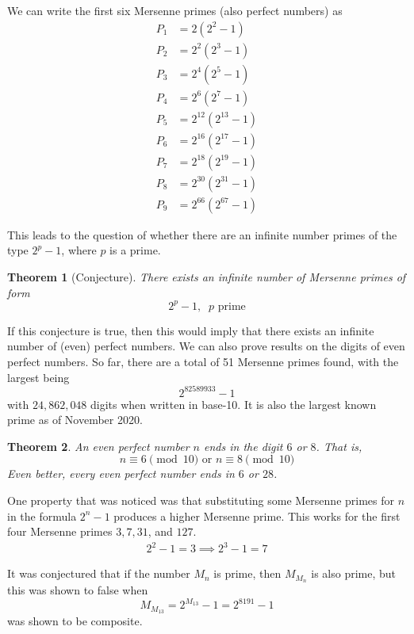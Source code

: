 \documentclass{article}
\newtheorem{theorem}{Theorem}[section]
\theoremstyle{remark}
\theoremstyle{definition}
\begin{document}
We can write the first six Mersenne primes (also perfect numbers) as 
\begin{align*}
    P_1 & = 2(2^2 -1) \\
    P_2 & = 2^2 (2^3 - 1) \\
    P_3 & = 2^4 (2^5 - 1) \\
    P_4 & = 2^6 (2^7 - 1) \\
    P_5 & = 2^{12} (2^{13} - 1) \\
    P_6 & = 2^{16} (2^{17} - 1) \\
    P_7 & = 2^{18} (2^{19} - 1) \\
    P_8 & = 2^{30} (2^{31} - 1) \\
    P_9 & = 2^{66} (2^{67} - 1) 
\end{align*}

This leads to the question of whether there are an infinite number primes of the type $2^p - 1$, where $p$ is a prime. 

\begin{theorem}[Conjecture]
There exists an infinite number of Mersenne primes of form
\[2^p - 1, \;\; p \text{ prime}\]
\end{theorem}

If this conjecture is true, then this would imply that there exists an infinite number of (even) perfect numbers. We can also prove results on the digits of even perfect numbers. So far, there are a total of 51 Mersenne primes found, with the largest being
\[2^{82589933} -1\]
with $24,862,048$ digits when written in base-10. It is also the largest known prime as of November 2020. 

\begin{theorem}
An even perfect number $n$ ends in the digit $6$ or $8$. That is, 
\[n \equiv 6 \pmod{10} \text{ or } n \equiv 8 \pmod{10}\]
Even better, every even perfect number ends in $6$ or $28$. 
\end{theorem}

One property that was noticed was that substituting some Mersenne primes for $n$ in the formula $2^n - 1$ produces a higher Mersenne prime. This works for the first four Mersenne primes $3, 7, 31$, and $127$. 
\begin{align*}
    2^2 - 1 = 3 \implies 2^3 - 1 = 7 
\end{align*}

It was conjectured that if the number $M_n$ is prime, then $M_{M_n}$ is also prime, but this was shown to false when 
\[M_{M_{13}} = 2^{M_{13}} - 1 = 2^{8191} - 1\]
was shown to be composite. 
\end{document}
